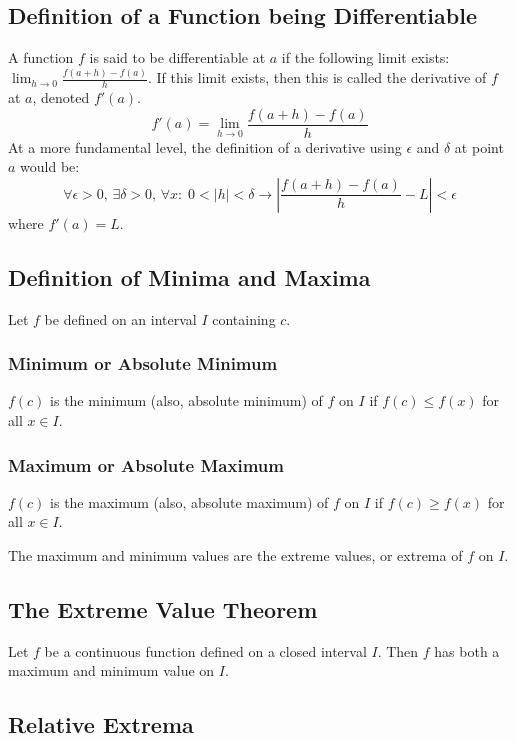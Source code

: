 \documentclass[12pt]{article}
\begin{document}
\subsection{Definition of a Function being Differentiable}

A function $f$ is said to be differentiable at $a$ if the following limit exists: $\lim_{h \rightarrow 0} \frac{f(a + h) - f(a)}{h}$. If this limit exists, then this is called the derivative of $f$ at $a$, denoted $f'(a)$. $$f'(a) = \lim_{h \rightarrow 0} \frac{f(a + h) - f(a)}{h}$$ 
At a more fundamental level, the definition of a derivative using $\epsilon$ and $\delta$ at point $a$ would be: $$\forall \epsilon > 0, \,\exists \delta > 0, \, \forall x: \; 0 < |h| < \delta \rightarrow \left | \frac{f(a +h) - f(a)}{h} -L \right | < \epsilon$$ where $f'(a) = L$. 

\subsection{Definition of Minima and Maxima}

Let $f$ be defined on an interval $I$ containing $c$. 

\subsubsection{Minimum or Absolute Minimum}
$f(c)$ is the minimum (also, absolute minimum) of $f$ on $I$ if $f(c) \leq f(x)$ for all $x \in I$.


\subsubsection{Maximum or Absolute Maximum}
$f(c)$ is the maximum (also, absolute maximum) of $f$ on $I$ if $f(c) \geq f(x)$ for all $x \in I$.

The maximum and minimum values are the extreme values, or extrema of $f$ on $I$. 

\subsection{The Extreme Value Theorem}

Let $f$ be a continuous function defined on a closed interval $I$. Then $f$ has both a maximum and minimum value on $I$. 

\subsection{Relative Extrema}
\end{document}
